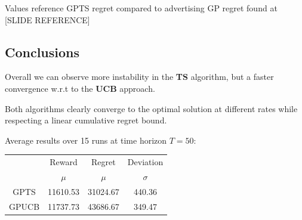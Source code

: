 {\scriptsize Values reference GPTS regret compared to advertising GP regret found at [SLIDE REFERENCE]}


\subsection{Conclusions}

Overall we can observe more instability in the \textbf{TS} algorithm, but a faster convergence w.r.t to the \textbf{UCB} approach.

Both algorithms clearly converge to the optimal solution at different rates while respecting a linear cumulative regret bound.

Average results over 15 runs at time horizon $T = 50$:

\begin{table}[h]
	\begin{tabular}{|c|cc|c|}
	\hline \hline
		\cellcolor{blue!25} & Reward 	& Regret	& Deviation \\
	\cline{2-4}
		\cellcolor{blue!25} & $\mu$		& $\mu$		& $\sigma$	\\
	\hline \hline
		GPTS 				& 11610.53 	& 31024.67	& 440.36 	\\
	\hline
		GPUCB				& 11737.73	& 43686.67	& 349.47	\\
	\hline \hline
	\end{tabular}
\end{table}

